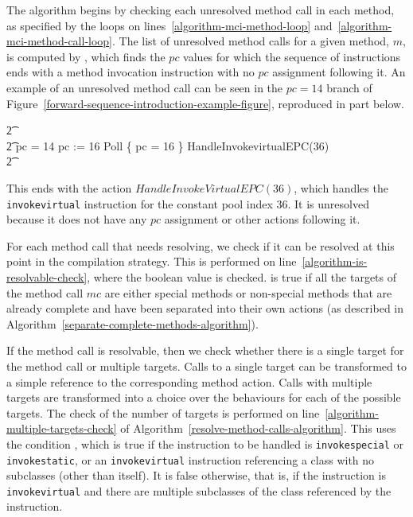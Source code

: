 The algorithm begins by checking each unresolved method call in each
method, as specified by the loops on
lines~\ref{algorithm-mci-method-loop}
and~\ref{algorithm-mci-method-call-loop}.
The list of unresolved method calls for a given method, $m$, is
computed by , which finds the $pc$
values for which the sequence of instructions ends with a method
invocation instruction with no $pc$ assignment following it.
An example of an unresolved method call can be seen in the $pc = 14$
branch of Figure~\ref{forward-sequence-introduction-example-figure},
reproduced in part below.
\begin{circusaction}
  \t2 {} \cdots {} \\
  \t2 {} \circelse pc = 14 \circthen \cdots \circseq pc := 16 \circseq Poll \circseq \{ pc = 16 \} \circseq HandleInvokevirtualEPC(36) \\
  \t2 {} \cdots {}
\end{circusaction}
This ends with the action $HandleInvokeVirtualEPC(36)$, which handles
the \texttt{invokevirtual} instruction for the constant pool index
$36$.
It is unresolved because it does not have any $pc$ assignment or other
actions following it.

For each method call that needs resolving, we check if it can be
resolved at this point in the compilation strategy.
This is performed on line~\ref{algorithm-is-resolvable-check}, where
the boolean value  is checked.
 is true if all the targets of the method
call $mc$ are either special methods or non-special methods that are
already complete and have been separated into their own actions (as
described in Algorithm~\ref{separate-complete-methods-algorithm}).

If the method call is resolvable, then we check whether there is a
single target for the method call or multiple targets.
Calls to a single target can be transformed to a simple reference to
the corresponding method action.
Calls with multiple targets are transformed into a choice over the
behaviours for each of the possible targets.
The check of the number of targets is performed on
line~\ref{algorithm-multiple-targets-check} of
Algorithm~\ref{resolve-method-calls-algorithm}.
This uses the condition , which is true if
the instruction to be handled is \texttt{invokespecial} or
\texttt{invokestatic}, or an \texttt{invokevirtual} instruction
referencing a class with no subclasses (other than itself).
It is false otherwise, that is, if the instruction is
\texttt{invokevirtual} and there are multiple subclasses of the class
referenced by the instruction.

